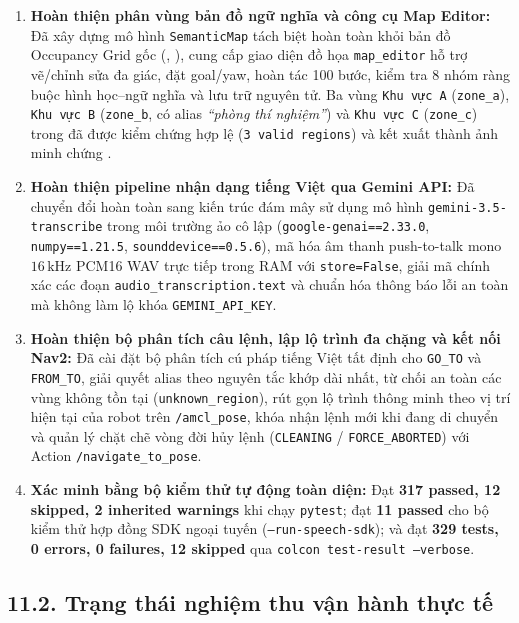 \begin{enumerate}[leftmargin=1.2cm]
  \item \textbf{Hoàn thiện phân vùng bản đồ ngữ nghĩa và công cụ Map Editor:} Đã xây dựng mô hình \texttt{SemanticMap} tách biệt hoàn toàn khỏi bản đồ Occupancy Grid gốc (, ), cung cấp giao diện đồ họa \texttt{map\_editor} hỗ trợ vẽ/chỉnh sửa đa giác, đặt goal/yaw, hoàn tác 100 bước, kiểm tra 8 nhóm ràng buộc hình học--ngữ nghĩa và lưu trữ nguyên tử. Ba vùng \texttt{Khu vực A} (\texttt{zone\_a}), \texttt{Khu vực B} (\texttt{zone\_b}, có alias \textit{``phòng thí nghiệm''}) và \texttt{Khu vực C} (\texttt{zone\_c}) trong  đã được kiểm chứng hợp lệ (\texttt{3 valid regions}) và kết xuất thành ảnh minh chứng .
  \item \textbf{Hoàn thiện pipeline nhận dạng tiếng Việt qua Gemini API:} Đã chuyển đổi hoàn toàn sang kiến trúc đám mây sử dụng mô hình \texttt{gemini-3.5-transcribe} trong môi trường ảo cô lập  (\texttt{google-genai==2.33.0}, \texttt{numpy==1.21.5}, \texttt{sounddevice==0.5.6}), mã hóa âm thanh push-to-talk mono $16\,\text{kHz}$ PCM16 WAV trực tiếp trong RAM với \texttt{store=False}, giải mã chính xác các đoạn \texttt{audio\_transcription.text} và chuẩn hóa thông báo lỗi an toàn mà không làm lộ khóa \texttt{GEMINI\_API\_KEY}.
  \item \textbf{Hoàn thiện bộ phân tích câu lệnh, lập lộ trình đa chặng và kết nối Nav2:} Đã cài đặt bộ phân tích cú pháp tiếng Việt tất định cho \texttt{GO\_TO} và \texttt{FROM\_TO}, giải quyết alias theo nguyên tắc khớp dài nhất, từ chối an toàn các vùng không tồn tại (\texttt{unknown\_region}), rút gọn lộ trình thông minh theo vị trí hiện tại của robot trên \texttt{/amcl\_pose}, khóa nhận lệnh mới khi đang di chuyển và quản lý chặt chẽ vòng đời hủy lệnh (\texttt{CLEANING} / \texttt{FORCE\_ABORTED}) với Action \texttt{/navigate\_to\_pose}.
  \item \textbf{Xác minh bằng bộ kiểm thử tự động toàn diện:} Đạt \textbf{317 passed, 12 skipped, 2 inherited warnings} khi chạy \texttt{pytest}; đạt \textbf{11 passed} cho bộ kiểm thử hợp đồng SDK ngoại tuyến (\texttt{--run-speech-sdk}); và đạt \textbf{329 tests, 0 errors, 0 failures, 12 skipped} qua \texttt{colcon test-result --verbose}.
\end{enumerate}

\subsection*{11.2. Trạng thái nghiệm thu vận hành thực tế}


